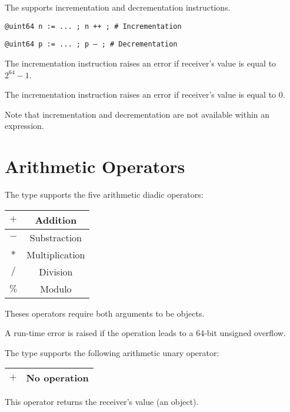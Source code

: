 The  supports incrementation and decrementation instructions.

\texttt{@uint64 n := ... ; n ++ ; \# Incrementation}

\texttt{@uint64 p := ... ; p -- ; \# Decrementation}\newline

The incrementation instruction raises an error if receiver's value is equal to $2^{64}-1$.\newline

The incrementation instruction raises an error if receiver's value is equal to 0.\newline

Note that incrementation and decrementation are not available within an expression.




\section{Arithmetic Operators}

The  type supports the five arithmetic diadic operators:\newline

\begin{tabular}{|c|c|}
\hline
$+$ & Addition \\
\hline
$-$ & Substraction \\
\hline
$*$ & Multiplication \\
\hline
$/$ & Division \\
\hline
$\%$ & Modulo \\
\hline
\end{tabular}

Theses operators require both arguments to be  objects.\newline

A run-time error is raised if the operation leads to a 64-bit unsigned overflow.

The  type supports the following arithmetic unary operator:\newline

\begin{tabular}{|c|c|}
\hline
$+$ & No operation \\
\hline
\end{tabular}

This operator returns the receiver's value (an   object).




